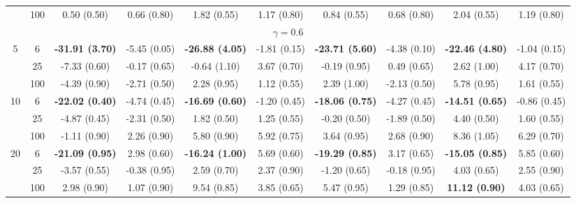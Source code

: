 \documentclass[
  man]{apa6}
\newenvironment{lltable}{\begin{landscape}\centering\begin{ThreePartTable}}{\end{ThreePartTable}\end{landscape}}
\begin{document}
\begin{lltable}
{\begin{longtable}{cccccccccc}
 & 100 & 0.50 (0.50) & 0.66 (0.80) & 1.82 (0.55) & 1.17 (0.80) & 0.84 (0.55) & 0.68 (0.80) & 2.04 (0.55) & 1.19 (0.80)\\
\multicolumn{10}{c}{$\gamma = 0.6$}\\
5 & 6 & \textbf{-31.91 (3.70)} & -5.45 (0.05) & \textbf{-26.88 (4.05)} & -1.81 (0.15) & \textbf{-23.71 (5.60)} & -4.38 (0.10) & \textbf{-22.46 (4.80)} & -1.04 (0.15)\\
 & 25 & -7.33 (0.60) & -0.17 (0.65) & -0.64 (1.10) & 3.67 (0.70) & -0.19 (0.95) & 0.49 (0.65) & 2.62 (1.00) & 4.17 (0.70)\\
 & 100 & -4.39 (0.90) & -2.71 (0.50) & 2.28 (0.95) & 1.12 (0.55) & 2.39 (1.00) & -2.13 (0.50) & 5.78 (0.95) & 1.61 (0.55)\\
10 & 6 & \textbf{-22.02 (0.40)} & -4.74 (0.45) & \textbf{-16.69 (0.60)} & -1.20 (0.45) & \textbf{-18.06 (0.75)} & -4.27 (0.45) & \textbf{-14.51 (0.65)} & -0.86 (0.45)\\
 & 25 & -4.87 (0.45) & -2.31 (0.50) & 1.82 (0.50) & 1.25 (0.55) & -0.20 (0.50) & -1.89 (0.50) & 4.40 (0.50) & 1.60 (0.55)\\
 & 100 & -1.11 (0.90) & 2.26 (0.90) & 5.80 (0.90) & 5.92 (0.75) & 3.64 (0.95) & 2.68 (0.90) & 8.36 (1.05) & 6.29 (0.70)\\
20 & 6 & \textbf{-21.09 (0.95)} & 2.98 (0.60) & \textbf{-16.24 (1.00)} & 5.69 (0.60) & \textbf{-19.29 (0.85)} & 3.17 (0.65) & \textbf{-15.05 (0.85)} & 5.85 (0.60)\\
 & 25 & -3.57 (0.55) & -0.38 (0.95) & 2.59 (0.70) & 2.37 (0.90) & -1.20 (0.65) & -0.18 (0.95) & 4.03 (0.65) & 2.55 (0.90)\\
 & 100 & 2.98 (0.90) & 1.07 (0.90) & 9.54 (0.85) & 3.85 (0.65) & 5.47 (0.95) & 1.29 (0.85) & \textbf{11.12 (0.90)} & 4.03 (0.65)\\
\bottomrule
\end{longtable}

}

\end{lltable}
\end{document}

